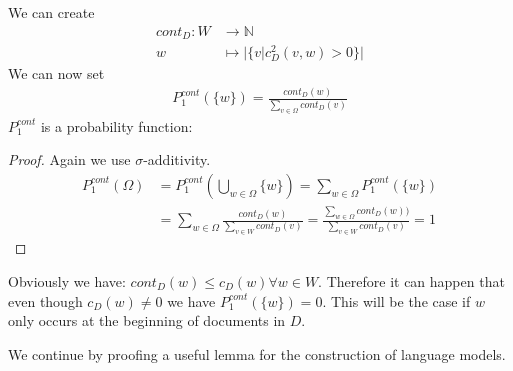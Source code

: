\documentclass[•]{book}
\begin{document}
\begin{example}
\begin{description}
We can create 
\begin{align}
cont_D:  W & \rightarrow\mathbb{N} \\
w  & \mapsto |\{v| c_D^2(v,w) > 0\}|
\end{align}
We can now set 
\begin{align}
P_1^{cont}(\{w\}) = \frac{cont_D(w)}{\sum_{v\in\Omega}cont_D(v)}
\end{align}
$P_1^{cont}$ is a probability function:
\begin{proof}
Again we use $\sigma$-additivity.
\begin{align}
P_1^{cont}(\Omega) & = P_1^{cont}(\bigcup_{w\in\Omega}\{w\}) = \sum_{w\in\Omega}P_1^{cont}(\{w\} )  \\
& =  \sum_{w\in\Omega} \frac{cont_D(w)}{\sum_{v\in W}cont_D(v)} = \frac{\sum_{w\in \Omega}cont_D(w))}{\sum_{v\in W}cont_D(v)} = 1
\end{align} 
\end{proof}
Obviously we have: $cont_D(w) \leq c_D(w) \forall w\in W$. Therefore it can happen that even though $c_D(w) \neq 0$ we have $P_1^{cont}(\{w\}) = 0$. This will be the case if $w$ only occurs at the beginning of documents in $D$.
\end{description}
\end{example}

We continue by proofing a useful lemma for the construction of language models. 
\end{document}
